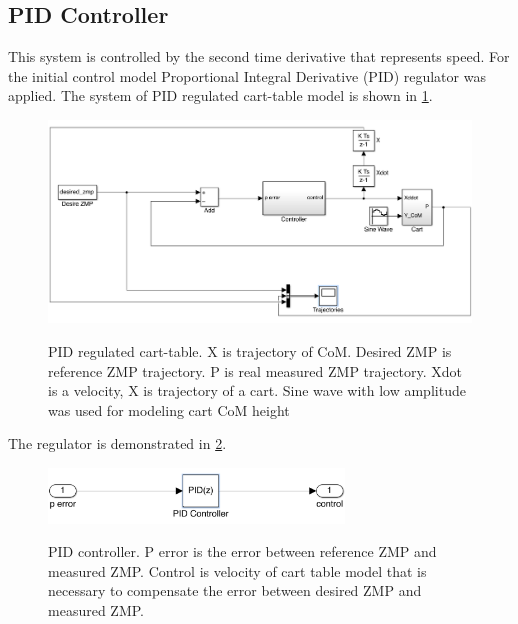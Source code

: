 \documentclass[12pt,a4paper]{report}
\begin{document}
			\subsection{PID Controller}
				This system is controlled by the second time derivative that represents speed. For the initial control model Proportional Integral Derivative (PID) regulator was applied. The system of PID regulated cart-table model is shown in \cref{fig:15}.
				
				\begin{figure}[H]
					\vspace{-0.2cm}
					\centering
					{\includegraphics[width=1\textwidth]{15}}
					\caption{PID regulated cart-table. X is trajectory of CoM. Desired ZMP is reference ZMP trajectory. P is real measured ZMP trajectory. Xdot is a velocity, X is trajectory of a cart. Sine wave with low amplitude was used for modeling cart CoM height}
					\label{fig:15}
					\vspace{-0.1cm}
				\end{figure}
				
				The regulator is demonstrated in \cref{fig:16}.
				
				\begin{figure}[H]
					\vspace{-0.2cm}
					\centering
					{\includegraphics[width=0.7\textwidth]{16}}
					\caption{PID controller. P error is the error between reference ZMP and measured ZMP. Control is velocity of cart table model that is necessary to compensate the error between desired ZMP and measured ZMP.}
					\label{fig:16}
					\vspace{-0.1cm}
				\end{figure}
				
\end{document}
